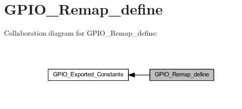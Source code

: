 \hypertarget{group___g_p_i_o___remap__define}{}\section{G\+P\+I\+O\+\_\+\+Remap\+\_\+define}
\label{group___g_p_i_o___remap__define}
Collaboration diagram for G\+P\+I\+O\+\_\+\+Remap\+\_\+define\+:
\nopagebreak
\begin{figure}[H]
\begin{center}
\leavevmode
\includegraphics[width=350pt]{group___g_p_i_o___remap__define}
\end{center}
\end{figure}
